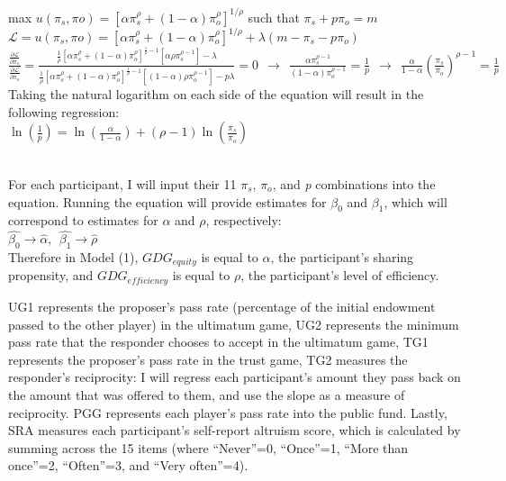 \documentclass{article}
\begin{document}
max \(u(\pi_{s}, \pi{o}) = [\alpha\pi_{s}^{\rho} + (1-\alpha)\pi_{o}^{\rho}]^{1/ \rho }\) such that \(\pi_{s} + p\pi_{o} = m\) \\

\(\mathcal{L} = u(\pi_{s}, \pi{o}) = [\alpha\pi_{s}^{\rho} + (1-\alpha)\pi_{o}^{\rho}]^{1/ \rho } + \lambda (m-\pi_{s}-p\pi_{o})\) \\

\(\frac{\frac{\partial \mathcal{L}}{\partial \pi_{s}}}{\frac{\partial \mathcal{L}}{\partial \pi_{o}}} = \frac{\frac{1}{\rho}[\alpha\pi_{s}^{\rho} + (1-\alpha)\pi_{o}^{\rho}]^{\frac{1}{\rho} -1}[\alpha\rho\pi_{s}^{\rho-1}]-\lambda}{\frac{1}{\rho}[\alpha\pi_{s}^{\rho} + (1-\alpha)\pi_{o}^{\rho}]^{\frac{1}{\rho} -1}[(1-\alpha)\rho\pi_{o}^{\rho-1}] - p\lambda} = 0 \ \ \longrightarrow \ \ \frac{\alpha\pi_{s}^{\rho-1}}{(1-\alpha)\pi_{o}^{\rho-1}} = \frac{1}{p} \ \ \longrightarrow \ \ \frac{\alpha}{1-\alpha}(\frac{\pi_{s}}{\pi_{o}})^{\rho-1} = \frac{1}{p}\) 
 \\
 
\noindent
Taking the natural logarithm on each side of the equation will result in the following regression:  \\

\indent
\( \ln(\frac{1}{p}) = \ln(\frac{\alpha}{1-\alpha})+(\rho-1)\ln(\frac{\pi_{s}}{\pi_{o}}) \)

\noindent
\\
For each participant, I will input their 11 \(\pi_{s}\), \(\pi_{o}\), and \textit{p} combinations into the equation. Running the equation will provide estimates for \(\beta_{0}\) and \(\beta_{1}\), which will correspond to estimates for \(\alpha\) and \(\rho\), respectively: \\

\(\hat{\beta_{0}} \rightarrow \hat{\alpha}, \ \  \hat{\beta_{1}} \rightarrow \hat{\rho} \) \\

Therefore in Model (1), \(GDG_{equity}\) is equal to \(\alpha\), the participant's sharing propensity, and \(GDG_{efficiency}\) is equal to \(\rho\), the participant's level of efficiency. 

UG1 represents the proposer\rq s pass rate (percentage of the initial endowment passed to the other player) in the ultimatum game, UG2 represents the minimum pass rate that the responder chooses to accept in the ultimatum game, TG1 represents the proposer\rq s pass rate in the trust game, TG2 measures the responder\rq s reciprocity: I will regress each participant's amount they pass back on the amount that was offered to them, and use the slope as a measure of reciprocity. PGG represents each player\rq s pass rate into the public fund. Lastly, SRA measures each participant\rq s self-report altruism score, which is calculated by summing across the 15 items (where ``Never''=0, ``Once''=1, ``More than once''=2, ``Often''=3, and ``Very often''=4).  
\end{document}
